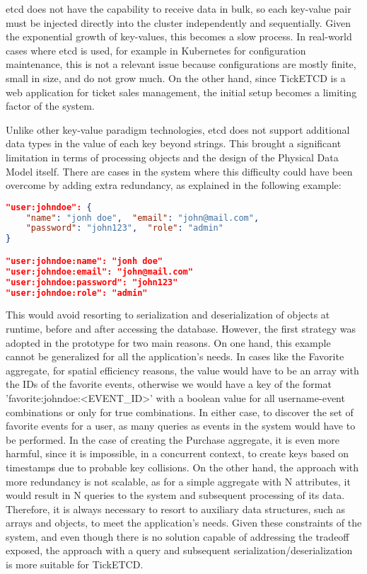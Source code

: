 \documentclass[screen,review]{acmart}
\begin{document}
etcd does not have the capability to receive data in bulk, so each key-value pair must be injected directly into the cluster independently and sequentially. Given the exponential growth of key-values, this becomes a slow process. In real-world cases where etcd is used, for example in Kubernetes for configuration maintenance, this is not a relevant issue because configurations are mostly finite, small in size, and do not grow much. On the other hand, since TickETCD is a web application for ticket sales management, the initial setup becomes a limiting factor of the system.

Unlike other key-value paradigm technologies, etcd does not support additional data types in the value of each key beyond strings. This brought a significant limitation in terms of processing objects and the design of the Physical Data Model itself. There are cases in the system where this difficulty could have been overcome by adding extra redundancy, as explained in the following example:

\begin{lstlisting}[language=json]
"user:johndoe": { 
    "name": "jonh doe",  "email": "john@mail.com", 
    "password": "john123",  "role": "admin"
}

"user:johndoe:name": "jonh doe"
"user:johndoe:email": "john@mail.com"
"user:johndoe:password": "john123"
"user:johndoe:role": "admin"
\end{lstlisting}

This would avoid resorting to serialization and deserialization of objects at runtime, before and after accessing the database. However, the first strategy was adopted in the prototype for two main reasons. On one hand, this example cannot be generalized for all the application's needs. In cases like the Favorite aggregate, for spatial efficiency reasons, the value would have to be an array with the IDs of the favorite events, otherwise we would have a key of the format 'favorite:johndoe:<EVENT\_ID>' with a boolean value for all username-event combinations or only for true combinations. In either case, to discover the set of favorite events for a user, as many queries as events in the system would have to be performed. In the case of creating the Purchase aggregate, it is even more harmful, since it is impossible, in a concurrent context, to create keys based on timestamps due to probable key collisions. On the other hand, the approach with more redundancy is not scalable, as for a simple aggregate with N attributes, it would result in N queries to the system and subsequent processing of its data. Therefore, it is always necessary to resort to auxiliary data structures, such as arrays and objects, to meet the application's needs. Given these constraints of the system, and even though there is no solution capable of addressing the tradeoff exposed, the approach with a query and subsequent serialization/deserialization is more suitable for TickETCD.
\end{document}
